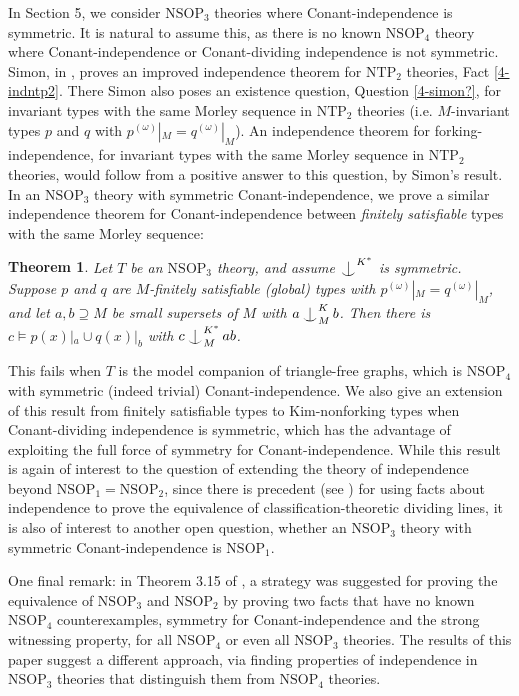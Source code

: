 \documentclass[12pt]{amsart}
\newtheorem{theorem}{Theorem}[section]
\theoremstyle{definition}
\def\Ind#1#2{#1\setbox0=\hbox{$#1x$}\kern\wd0\hbox to 0pt{\hss$#1\mid$\hss}
\lower.9\ht0\hbox to 0pt{\hss$#1\smile$\hss}\kern\wd0}
\def\ind{\mathop{\mathpalette\Ind{}}}
\begin{document}
In Section 5, we consider $\mathrm{NSOP}_{3}$ theories where Conant-independence is symmetric. It is natural to assume this, as there is no known $\mathrm{NSOP}_{4}$ theory where Conant-independence or Conant-dividing independence is not symmetric. Simon, in \cite{Sim20}, proves an improved independence theorem for $\mathrm{NTP}_{2}$ theories, Fact \ref{4-indntp2}. There Simon also poses an existence question, Question \ref{4-simon?}, for invariant types with the same Morley sequence in $\mathrm{NTP}_{2}$ theories (i.e. $M$-invariant types $p$ and $q$ with $p^{(\omega)}|_{M} = q^{(\omega)}|_{M}$). An independence theorem for forking-independence, for invariant types with the same Morley sequence in $\mathrm{NTP}_{2}$ theories, would follow from a positive answer to this question, by Simon's result. In an $\mathrm{NSOP}_{3}$ theory with symmetric Conant-independence, we prove a similar independence theorem for Conant-independence between \textit{finitely satisfiable} types with the same Morley sequence:

\begin{theorem} \label{4-main000}
Let $T$ be an $\mathrm{NSOP}_{3}$ theory, and assume $\ind^{K^{*}}$ is symmetric. Suppose $p$ and $q$ are $M$-finitely satisfiable (global) types with $p^{(\omega)}|_{M} = q^{(\omega)}|_{M}$, and let $a, b \supseteq M$ be small supersets of $M$ with $a \ind^{K}_{M} b$. Then there is $c \models p(x)|_{a} \cup q(x)|_{b}$ with $c \ind^{K^{*}}_{M} ab$.

\end{theorem}

This fails when $T$ is the model companion of triangle-free graphs, which is $\mathrm{NSOP}_{4}$ with symmetric (indeed trivial) Conant-independence. We also give an extension of this result from finitely satisfiable types to Kim-nonforking types when Conant-dividing independence is symmetric, which has the advantage of exploiting the full force of symmetry for Conant-independence. While this result is again of interest to the question of extending the theory of independence beyond $\mathrm{NSOP}_{1}=\mathrm{NSOP}_{2}$, since there is precedent (see \cite{NSOP2}) for using facts about independence to prove the equivalence of classification-theoretic dividing lines, it is also of interest to another open question, whether an $\mathrm{NSOP}_{3}$ theory with symmetric Conant-independence is $\mathrm{NSOP}_{1}$.

One final remark: in Theorem 3.15 of \cite{GFA}, a strategy was suggested for proving the equivalence of $\mathrm{NSOP}_{3}$ and $\mathrm{NSOP}_{2}$ by proving two facts that have no known $\mathrm{NSOP}_{4}$ counterexamples, symmetry for Conant-independence and the strong witnessing property, for all $\mathrm{NSOP}_{4}$ or even all $\mathrm{NSOP}_{3}$ theories. The results of this paper suggest a different approach, via finding properties of independence in $\mathrm{NSOP}_{3}$ theories that distinguish them from $\mathrm{NSOP}_{4}$ theories.
\end{document}
